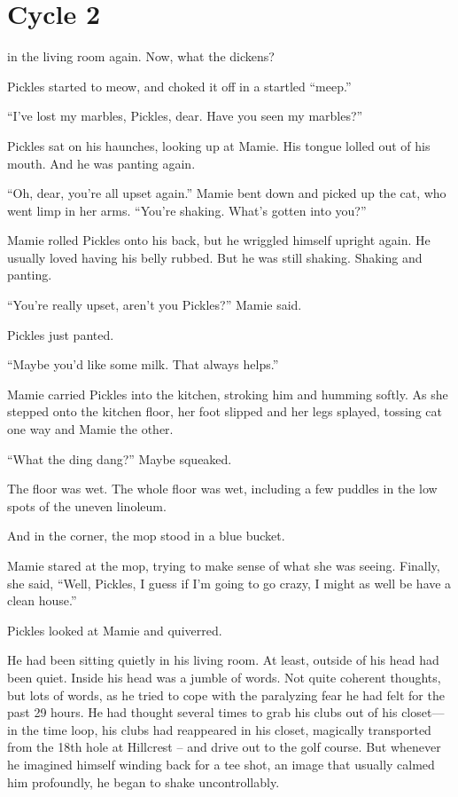 \chapter{Cycle 2}


 in the living room again. Now, what the dickens?

Pickles started to meow, and choked it off in a startled ``meep.''

``I've lost my marbles, Pickles, dear. Have you seen my marbles?''

Pickles sat on his haunches, looking up at Mamie. His tongue lolled out of his mouth. And he was panting again.

``Oh, dear, you're all upset again.'' Mamie bent down and picked up the cat, who went limp in her arms. ``You're shaking. What's gotten into you?''

Mamie rolled Pickles onto his back, but he wriggled himself upright again. He usually loved having his belly rubbed. But he was still shaking. Shaking and panting.

``You're really upset, aren't you Pickles?'' Mamie said.

Pickles just panted.

``Maybe you'd like some milk. That always helps.''

Mamie carried Pickles into the kitchen, stroking him and humming softly. As she stepped onto the kitchen floor, her foot slipped and her legs splayed, tossing cat one way and Mamie the other.

``What the ding dang?'' Maybe squeaked.

The floor was wet. The whole floor was wet, including a few puddles in the low spots of the uneven linoleum.

And in the corner, the mop stood in a blue bucket.

Mamie stared at the mop, trying to make sense of what she was seeing. Finally, she said, ``Well, Pickles, I guess if I'm going to go crazy, I might as well be have a clean house.''

Pickles looked at Mamie and quiverred.




 He had been sitting quietly in his living room. At least, outside of his head had been quiet. Inside his head was a jumble of words. Not quite coherent thoughts, but lots of words, as he tried to cope with the paralyzing fear he had felt for the past 29 hours. He had thought several times to grab his clubs out of his closet---in the time loop, his clubs had reappeared in his closet, magically transported from the 18th hole at Hillcrest – and drive out to the golf course. But whenever he imagined himself winding back for a tee shot, an image that usually calmed him profoundly, he began to shake uncontrollably.

